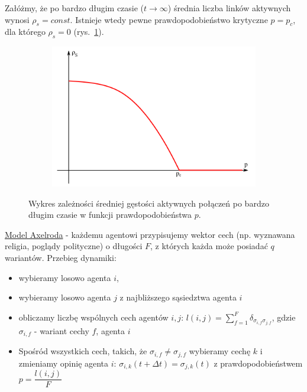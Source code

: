 Załóżmy, że po bardzo długim czasie ($ t \to \infty $) średnia liczba linków aktywnych wynosi $ \rho_s = const. $ Istnieje wtedy pewne prawdopodobieństwo krytyczne $ p = p_c $, dla którego $ \rho_s = 0 $ (rys.~\ref{density}).

\begin{figure} [H]
	\centering
	\begin{subfigure}{.7\textwidth}
		\centering
		\includegraphics[width=1.0\linewidth]{EDMIIssues/Figures/density.png}
	\end{subfigure}
	\caption{Wykres zależności średniej gęstości aktywnych połączeń po bardzo długim czasie w funkcji prawdopodobieństwa $ p $.}
	\label{density}
\end{figure}

\underline{Model Axelroda} - każdemu agentowi przypisujemy wektor cech (np. wyznawana religia, poglądy polityczne) o długości $ F $, z których każda może posiadać $ q $ wariantów. Przebieg dynamiki:
\begin{itemize}
	\item wybieramy losowo agenta $ i $,
	\item wybieramy losowo agenta $ j $ z najbliższego sąsiedztwa agenta $ i $
	\item obliczamy liczbę wspólnych cech agentów $ i, j$:\newline
	$ l(i, j) = \sum_{f=1}^F \delta_{\sigma_{i,f}\sigma_{j,f}} $, gdzie $ \sigma_{i,f} $ - wariant cechy $ f $, agenta $ i $
	\item Spośród wszystkich cech, takich, że $ \sigma_{i,f} \neq \sigma_{j,f} $ wybieramy cechę $ k $ i zmieniamy opinię agenta $ i $: $\sigma_{i,k}(t+\Delta t) = \sigma_{j,k}(t) $ z prawdopodobieństwem $ p = \dfrac{l(i,j)}{F} $
\end{itemize}

